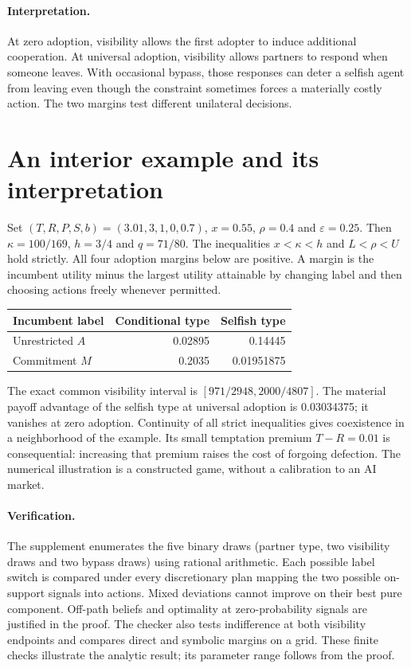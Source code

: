 \documentclass[11pt]{article}
\begin{document}
\paragraph{Interpretation.}
At zero adoption, visibility allows the first adopter to induce additional cooperation. At universal adoption, visibility allows partners to respond when someone leaves. With occasional bypass, those responses can deter a selfish agent from leaving even though the constraint sometimes forces a materially costly action. The two margins test different unilateral decisions.

\newpage
\section{An interior example and its interpretation}
Set $(T,R,P,S,b)=(3.01,3,1,0,0.7)$, $x=0.55$, $\rho=0.4$ and $\varepsilon=0.25$. Then $\kappa=100/169$, $h=3/4$ and $q=71/80$. The inequalities $x<\kappa<h$ and $L<\rho<U$ hold strictly. All four adoption margins below are positive. A margin is the incumbent utility minus the largest utility attainable by changing label and then choosing actions freely whenever permitted.

\begin{center}
\begin{tabular}{lrr}
\toprule
Incumbent label & Conditional type & Selfish type\\
\midrule
Unrestricted $A$ & 0.02895 & 0.14445\\
Commitment $M$ & 0.2035 & 0.01951875\\
\bottomrule
\end{tabular}
\end{center}

The exact common visibility interval is $[971/2948,2000/4807]$. The material payoff advantage of the selfish type at universal adoption is 0.03034375; it vanishes at zero adoption. Continuity of all strict inequalities gives coexistence in a neighborhood of the example. Its small temptation premium $T-R=0.01$ is consequential: increasing that premium raises the cost of forgoing defection. The numerical illustration is a constructed game, without a calibration to an AI market.

\paragraph{Verification.}
The supplement enumerates the five binary draws (partner type, two visibility draws and two bypass draws) using rational arithmetic. Each possible label switch is compared under every discretionary plan mapping the two possible on-support signals into actions. Mixed deviations cannot improve on their best pure component. Off-path beliefs and optimality at zero-probability signals are justified in the proof. The checker also tests indifference at both visibility endpoints and compares direct and symbolic margins on a grid. These finite checks illustrate the analytic result; its parameter range follows from the proof.
\end{document}
